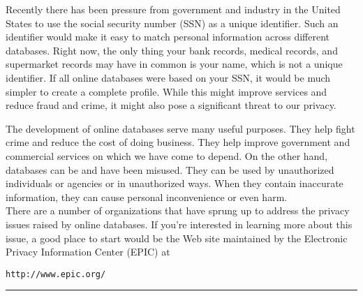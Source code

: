 Recently there has been pressure from government and industry in the
United States to use the social security number (SSN) as a unique
identifier.   Such an identifier would make it easy to match personal
information across different databases.  Right now, the only thing your
bank records, medical records, and supermarket records may have in
common is your name, which is not a unique identifier.   If all online
databases were based on your SSN, it would be much simpler to create a
complete profile.  While this might improve services and reduce
fraud and crime, it might also pose a significant threat to our
privacy.

The development of online databases serve many useful
purposes.  They help fight crime and reduce the cost of doing
business.  They help improve government and commercial services on which we
have come to depend.  On the other hand, databases can be and
have been misused.  They can be used by unauthorized individuals or
agencies or in unauthorized ways.  When they contain inaccurate
information, they can cause personal inconvenience or even harm.\\
\hspace*{1pc}There are a number of organizations that have sprung up to address
the privacy issues raised by online databases.  If you're interested
in learning more about this issue, a good place to start would be the
Web site maintained by the Electronic Privacy Information Center
(EPIC) at
\begin{jjjlisting}
\begin{lstlisting}[commentstyle=\color{black}]
http://www.epic.org/
\end{lstlisting}
\end{jjjlisting}
\rule[0pt]{26pc}{2pt}\\





